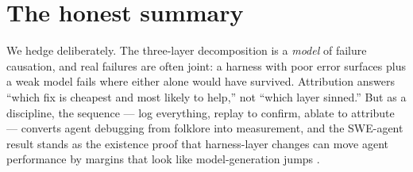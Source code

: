 \documentclass[11pt]{article}
\begin{document}
\section{The honest summary}
We hedge deliberately. The three-layer decomposition is a \emph{model} of failure causation, and real failures are often joint: a harness with poor error surfaces plus a weak model fails where either alone would have survived. Attribution answers ``which fix is cheapest and most likely to help,'' not ``which layer sinned.'' But as a discipline, the sequence --- log everything, replay to confirm, ablate to attribute --- converts agent debugging from folklore into measurement, and the SWE-agent result stands as the existence proof that harness-layer changes can move agent performance by margins that look like model-generation jumps \cite{yang2024sweagent}.



\end{document}
